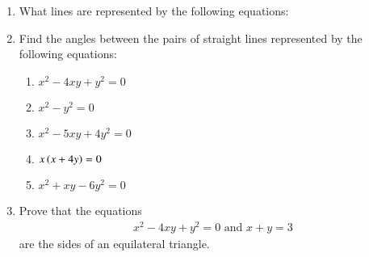 \renewcommand{\theequation}{\theenumi}
\begin{enumerate}[label=\arabic*.,ref=\thesubsection.\theenumi]
\item What lines are represented by the following equations:
\begin{multicols}{2}
\end{multicols}
\item Find the angles between the pairs of straight lines represented by the following equations:
\begin{multicols}{2}
\begin{enumerate}
\item
$
x^2-4xy+y^2 = 0
$
\item
$
x^2-y^2 = 0
$
\item
$
x^2-5xy+4y^2 = 0
$
\item
$
x\left(x+4y\right) = 0
$
\item
$
x^2+xy-6y^2 = 0
$
\end{enumerate}
\end{multicols}
\item Prove that the equations
\begin{align*}
x^2-4xy+y^2 = 0 \text{ and } x+y = 3
\end{align*}
are the sides of an equilateral triangle.
\end{enumerate}
